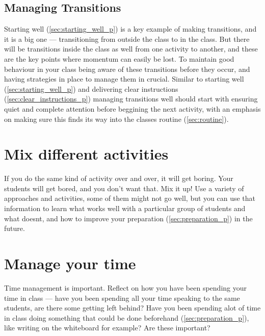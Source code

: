 \documentclass[12pt]{report}
\begin{document}
\subsection{Managing Transitions}
\label{sec:managing_transitions_p}

Starting well (\ref{sec:starting_well_p}) is a key example of making transitions, and it is a big one --- transitioning from outside the class to in the class. But there will be transitions inside the class as well from one activity to another, and these are the key points where momentum can easily be lost. To maintain good behaviour in your class being aware of these transitions before they occur, and having strategies in place to manage them in crucial. Similar to starting well (\ref{sec:starting_well_p}) and delivering clear instructions (\ref{sec:clear_instructions_p}) managing transitions well should start with ensuring quiet and complete attention before beggining the next activity, with an emphasis on making sure this finds its way into the classes routine (\ref{sec:routine}). 



\section{Mix different activities}
\label{sec:mix_differnt_activities_p}

If you do the same kind of activity over and over, it will get boring. Your students will get bored, and you don't want that. Mix it up! Use a variety of approaches and activities, some of them might not go well, but you can use that information to learn what works well with a particular group of students and what doesnt, and how to improve your preparation (\ref{sec:preparation_p}) in the future.



\section{Manage your time}
\label{sec:manage_your_time_p}

Time management is important. Reflect on how you have been spending your time in class --- have you been spending all your time speaking to the same students, are there some getting left behind? Have you been spending alot of time in class doing something that could be done beforehand (\ref{sec:preparation_p}), like writing on the whiteboard for example? Are these important?
\end{document}
